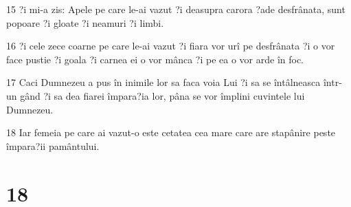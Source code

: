 \par 15 ?i mi-a zis: Apele pe care le-ai vazut ?i deasupra carora ?ade desfrânata, sunt popoare ?i gloate ?i neamuri ?i limbi.
\par 16 ?i cele zece coarne pe care le-ai vazut ?i fiara vor urî pe desfrânata ?i o vor face pustie ?i goala ?i carnea ei o vor mânca ?i pe ea o vor arde în foc.
\par 17 Caci Dumnezeu a pus în inimile lor sa faca voia Lui ?i sa se întâlneasca într-un gând ?i sa dea fiarei împara?ia lor, pâna se vor împlini cuvintele lui Dumnezeu.
\par 18 Iar femeia pe care ai vazut-o este cetatea cea mare care are stapânire peste împara?ii pamântului.

\chapter{18}

